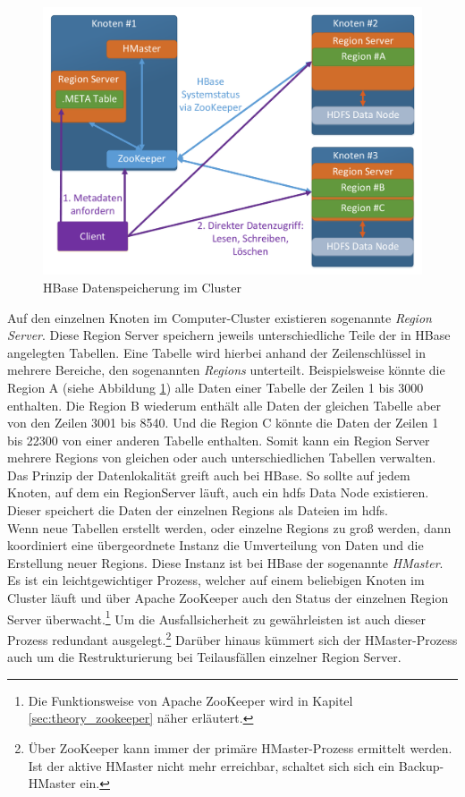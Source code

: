 \begin{figure}[ht]
  \centering
  \includegraphics[width=\textwidth]{./resource/hbase_cluster_architecture.pdf}
  \caption{HBase Datenspeicherung im Cluster}
  \label{fig:hbase_cluster_architecture}
\end{figure}

\noindent
Auf den einzelnen Knoten im Computer-Cluster existieren sogenannte \textit{Region Server}. Diese Region Server speichern jeweils unterschiedliche Teile der in HBase angelegten Tabellen. 
Eine Tabelle wird hierbei anhand der Zeilenschlüssel in mehrere Bereiche, den sogenannten \textit{Regions} unterteilt. Beispielsweise könnte die Region A (siehe Abbildung \ref{fig:hbase_cluster_architecture}) alle Daten einer Tabelle der Zeilen 1 bis 3000 enthalten. Die Region B wiederum enthält alle Daten der gleichen Tabelle aber von den Zeilen 3001 bis 8540. Und die Region C könnte die Daten der Zeilen 1 bis 22300 von einer anderen Tabelle enthalten. Somit kann ein Region Server mehrere Regions von gleichen oder auch unterschiedlichen Tabellen verwalten.  Das Prinzip der Datenlokalität greift auch bei HBase. So sollte auf  jedem Knoten, auf dem ein RegionServer läuft, auch ein \gls{hdfs} Data Node existieren. Dieser speichert die Daten der einzelnen Regions als Dateien im \gls{hdfs}.\\

\noindent
Wenn neue Tabellen erstellt werden, oder einzelne Regions zu groß werden, dann koordiniert eine übergeordnete Instanz die Umverteilung von Daten und die Erstellung neuer Regions. Diese Instanz ist bei HBase der sogenannte \textit{HMaster}. Es ist ein leichtgewichtiger Prozess, welcher auf einem beliebigen Knoten im Cluster läuft und über Apache ZooKeeper auch den Status der einzelnen Region Server überwacht.\footnote{Die Funktionsweise von Apache ZooKeeper wird in Kapitel \ref{sec:theory_zookeeper} näher erläutert.} Um die Ausfallsicherheit zu gewährleisten ist auch dieser Prozess redundant ausgelegt.\footnote{Über ZooKeeper kann immer der primäre HMaster-Prozess ermittelt werden. Ist der aktive HMaster nicht mehr erreichbar, schaltet sich sich ein Backup-HMaster ein.} Darüber hinaus kümmert sich der HMaster-Prozess auch um die Restrukturierung bei Teilausfällen einzelner Region Server. 

